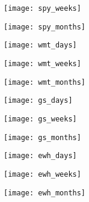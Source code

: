 \begin{figure} 
\centerline{\texttt{[image: spy\_weeks]}}
\caption{
\label{fig:Price_spy_w}
}
\end{figure} 

\begin{figure} 
\centerline{\texttt{[image: spy\_months]}}
\caption{
\label{fig:Price_spy_m}
}
\end{figure} 

\clearpage
\begin{figure}
\centerline{\texttt{[image: wmt\_days]}}
\caption{
\label{fig:Price_wmt_d}
}
\end{figure}

\begin{figure} 
\centerline{\texttt{[image: wmt\_weeks]}}
\caption{
\label{fig:Price_wmt_w}
}
\end{figure} 

\begin{figure} 
\centerline{\texttt{[image: wmt\_months]}}
\caption{
\label{fig:Price_wmt_m}
}
\end{figure} 

\clearpage
\begin{figure}
\centerline{\texttt{[image: gs\_days]}}
\caption{
\label{fig:Price_gs_d}
}
\end{figure}

\begin{figure} 
\centerline{\texttt{[image: gs\_weeks]}}
\caption{
\label{fig:Price_gs_w}
}
\end{figure} 

\begin{figure} 
\centerline{\texttt{[image: gs\_months]}}
\caption{
\label{fig:Price_gs_m}
}
\end{figure} 

\clearpage
\begin{figure}
\centerline{\texttt{[image: ewh\_days]}}
\caption{
\label{fig:Price_ewh_d}
}
\end{figure}

\begin{figure} 
\centerline{\texttt{[image: ewh\_weeks]}}
\caption{
\label{fig:Price_ewh_w}
}
\end{figure} 

\begin{figure} 
\centerline{\texttt{[image: ewh\_months]}}
\caption{
\label{fig:Price_ewh_m}
}
\end{figure} 

